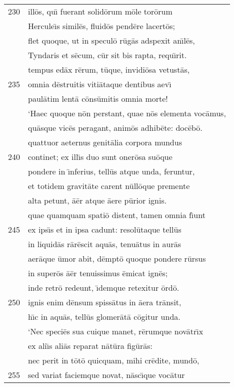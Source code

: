 \documentclass[paper=6in:9in,pagesize=pdftex,
               headinclude=on,footinclude=on,12pt]{scrbook}
\begin{document}
\begin{longtable}[p]{ r l }
230 & ill\=os, qu\={\i} fuerant solid\=orum m\=ole tor\=orum\\ 
 & Hercule\={\i}s simil\=es, fluid\=os pend\=ere lacert\=os;\\ 
 & flet quoque, ut in specul\=o r\=ug\=as adspexit an\={\i}l\=es,\\ 
 & Tyndaris et s\=ecum, c\=ur sit bis rapta, requ\={\i}rit.\\ 
 & tempus ed\=ax r\=erum, t\=uque, invidi\=osa vetust\=as,\\ 
235 & omnia d\=estruitis viti\=ataque dentibus aev\={\i}\\ 
 & paul\=atim lent\=a c\=ons\=umitis omnia morte!\\ 
 & \indent `Haec quoque n\=on perstant, quae n\=os elementa voc\=amus,\\ 
 & qu\=asque vic\=es peragant, anim\=os adhib\=ete: doc\=eb\=o.\\ 
 & quattuor aeternus genit\=alia corpora mundus\\ 
240 & continet; ex ill\={\i}s duo sunt oner\=osa su\=oque\\ 
 & pondere in \={\i}nferius, tell\=us atque unda, feruntur,\\ 
 & et totidem gravit\=ate carent n\=ull\=oque premente\\ 
 & alta petunt, \=a\=er atque \=aere p\=urior ignis.\\ 
 & quae quamquam spati\=o distent, tamen omnia f\={\i}unt\\ 
245 & ex ips\={\i}s et in ipsa cadunt: resol\=utaque tell\=us\\ 
 & in liquid\=as r\=ar\=escit aqu\=as, tenu\=atus in aur\=as\\ 
 & aer\=aque \=umor abit, d\=empt\=o quoque pondere r\=ursus\\ 
 & in super\=os \=a\=er tenuissimus \=emicat ign\=es;\\ 
 & inde retr\=o redeunt, \={\i}demque retexitur \=ord\=o.\\ 
250 & ignis enim d\=ensum spiss\=atus in \=aera tr\=ansit,\\ 
 & h\={\i}c in aqu\=as, tell\=us glomer\=at\=a c\=ogitur unda.\\ 
 & \indent `Nec speci\=es sua cuique manet, r\=erumque nov\=atr\={\i}x\\ 
 & ex ali\={\i}s ali\=as reparat n\=at\=ura fig\=ur\=as:\\ 
 & nec perit in t\=ot\=o quicquam, mihi cr\=edite, mund\=o,\\ 
255 & sed variat faciemque novat, n\=asc\={\i}que voc\=atur\\ 

\end{longtable}
\end{document}
